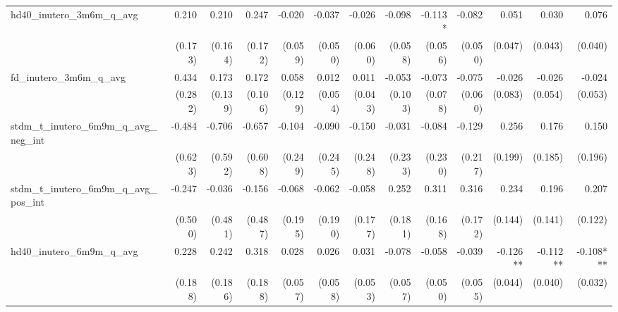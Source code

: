 \begin{tabular}{lrrrrrrrrrrrr}
hd40\_inutero\_3m6m\_q\_avg                 &        0.210 &        0.210 &        0.247 &       -0.020 &       -0.037 &       -0.026 &       -0.098 &      -0.113* &       -0.082 &        0.051 &        0.030 &        0.076 \\ 
                                            &      (0.173) &      (0.164) &      (0.172) &      (0.059) &      (0.050) &      (0.060) &      (0.058) &      (0.056) &      (0.050) &      (0.047) &      (0.043) &      (0.040) \\ 
fd\_inutero\_3m6m\_q\_avg                   &        0.434 &        0.173 &        0.172 &        0.058 &        0.012 &        0.011 &       -0.053 &       -0.073 &       -0.075 &       -0.026 &       -0.026 &       -0.024 \\ 
                                            &      (0.282) &      (0.139) &      (0.106) &      (0.129) &      (0.054) &      (0.043) &      (0.103) &      (0.078) &      (0.060) &      (0.083) &      (0.054) &      (0.053) \\ 
stdm\_t\_inutero\_6m9m\_q\_avg\_neg\_int    &       -0.484 &       -0.706 &       -0.657 &       -0.104 &       -0.090 &       -0.150 &       -0.031 &       -0.084 &       -0.129 &        0.256 &        0.176 &        0.150 \\ 
                                            &      (0.623) &      (0.592) &      (0.608) &      (0.249) &      (0.245) &      (0.248) &      (0.233) &      (0.230) &      (0.217) &      (0.199) &      (0.185) &      (0.196) \\ 
stdm\_t\_inutero\_6m9m\_q\_avg\_pos\_int    &       -0.247 &       -0.036 &       -0.156 &       -0.068 &       -0.062 &       -0.058 &        0.252 &        0.311 &        0.316 &        0.234 &        0.196 &        0.207 \\ 
                                            &      (0.500) &      (0.481) &      (0.487) &      (0.195) &      (0.190) &      (0.177) &      (0.181) &      (0.168) &      (0.172) &      (0.144) &      (0.141) &      (0.122) \\ 
hd40\_inutero\_6m9m\_q\_avg                 &        0.228 &        0.242 &        0.318 &        0.028 &        0.026 &        0.031 &       -0.078 &       -0.058 &       -0.039 &     -0.126** &     -0.112** &    -0.108*** \\ 
                                            &      (0.188) &      (0.186) &      (0.188) &      (0.057) &      (0.058) &      (0.053) &      (0.057) &      (0.050) &      (0.055) &      (0.044) &      (0.040) &      (0.032) \\ 

\end{tabular}

